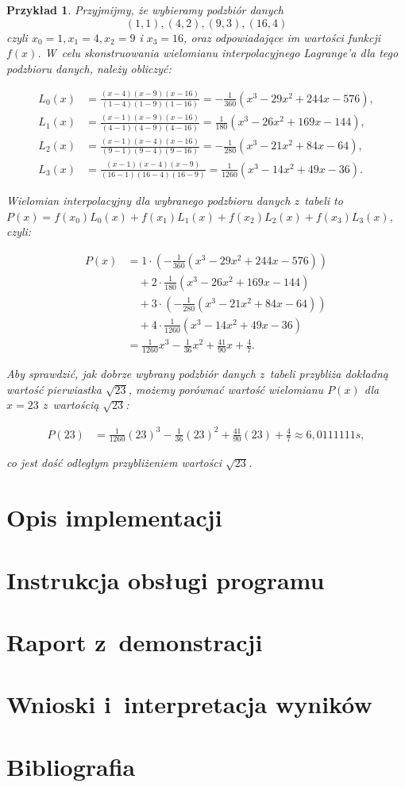 \documentclass[12pt]{article}
\newtheorem{example}{Przykład}
\begin{document}
\begin{example}

Przyjmijmy, że wybieramy podzbiór danych $${(1,1), (4,2), (9,3), (16,4)}$$ czyli $x_0=1, x_1=4, x_2=9$ i $x_3=16$, oraz odpowiadające im wartości funkcji $f(x)$. W~celu skonstruowania wielomianu interpolacyjnego Lagrange'a dla tego podzbioru danych, należy obliczyć:

\begin{align*}
L_0(x) &= \frac{(x-4)(x-9)(x-16)}{(1-4)(1-9)(1-16)} = -\frac{1}{360}(x^3 - 29x^2 + 244x - 576), \\
L_1(x) &= \frac{(x-1)(x-9)(x-16)}{(4-1)(4-9)(4-16)} = \frac{1}{180}(x^3 - 26x^2 + 169x - 144), \\
L_2(x) &= \frac{(x-1)(x-4)(x-16)}{(9-1)(9-4)(9-16)} = -\frac{1}{280}(x^3 - 21x^2 + 84x - 64), \\
L_3(x) &= \frac{(x-1)(x-4)(x-9)}{(16-1)(16-4)(16-9)} = \frac{1}{1260}(x^3 - 14x^2 + 49x - 36).
\end{align*}

Wielomian interpolacyjny dla wybranego podzbioru danych z~tabeli to \\ $P(x) = f(x_0)L_0(x) + f(x_1)L_1(x) + f(x_2)L_2(x) + f(x_3)L_3(x)$, czyli:

\begin{align*}
P(x) &= 1\cdot\left(-\frac{1}{360}(x^3 - 29x^2 + 244x - 576)\right) \\
&\quad + 2\cdot\frac{1}{180}(x^3 - 26x^2 + 169x - 144) \\
&\quad + 3\cdot\left(-\frac{1}{280}(x^3 - 21x^2 + 84x - 64)\right) \\
&\quad + 4\cdot\frac{1}{1260}(x^3 - 14x^2 + 49x - 36) \\
&= \frac{1}{1260}x^3 - \frac{1}{36}x^2 + \frac{41}{90}x + \frac{4}{7}.
\end{align*}

Aby sprawdzić, jak dobrze wybrany podzbiór danych z~tabeli przybliża dokładną wartość pierwiastka $\sqrt{23}$, możemy porównać wartość wielomianu $P(x)$ dla $x=23$ z~wartością $\sqrt{23}$:

\begin{align*}
P(23) &= \frac{1}{1260}(23)^3 - \frac{1}{36}(23)^2 + \frac{41}{90}(23) + \frac{4}{7} \approx 6,0111111s,
\end{align*}

co jest dość odległym przybliżeniem wartości $\sqrt{23}$.

\end{example}

\section{Opis implementacji}
\section{Instrukcja obsługi programu}
\section{Raport z~demonstracji}
\section{Wnioski i~interpretacja wyników}
\section*{Bibliografia}
\end{document}
